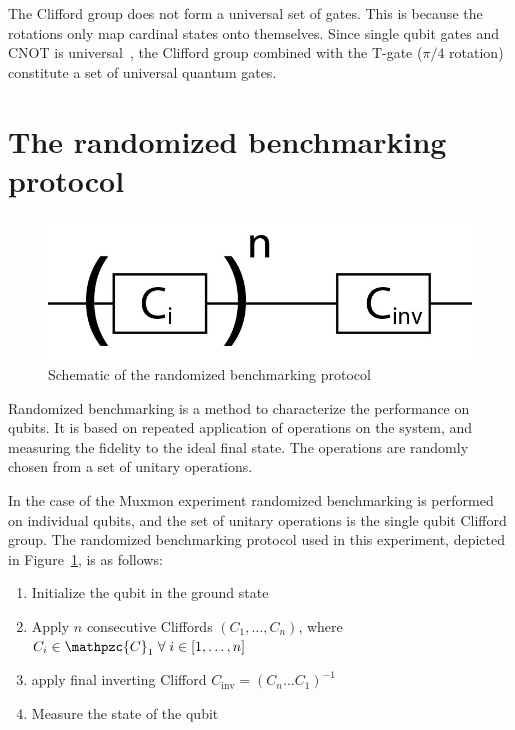       The Clifford group does not form a universal set of gates. This is because the rotations only map cardinal states onto themselves. Since single qubit gates and CNOT is universal~\cite{nielsen2010quantum}, the Clifford group combined with the T-gate ($\pi/4$ rotation) constitute a set of universal quantum gates.

    \section{The randomized benchmarking protocol}
      \label{sec:randomized benchmarking protocol}

      \begin{figure}
        \begin{center}
        \vspace{-30pt}
          \includegraphics[width=.8\textwidth]{../Figures/Randomized benchmarking/RB schematic.jpg}
        \end{center}
        \vspace{-20 pt}
        \caption{Schematic of the randomized benchmarking protocol}
        \label{fig:RB schematic}
      \end{figure}

      Randomized benchmarking is a method to characterize the performance on qubits. It is based on repeated application of operations on the system, and measuring the fidelity to the ideal final state. The operations are randomly chosen from a set of unitary operations.

      In the case of the Muxmon experiment randomized benchmarking is performed on individual qubits, and the set of unitary operations is the single qubit Clifford group. The randomized benchmarking protocol used in this experiment, depicted in Figure~\ref{fig:RB schematic}, is as follows:

      \begin{enumerate}
        \item Initialize the qubit in the ground state
        \item Apply $n$ consecutive Cliffords $\left(C_1, \dots, C_n\right)$, where $C_i \in \mathpzc{C}_1 \; \forall \; i \in \left[1, \dots, n\right]$
        \item apply final inverting Clifford $C_\text{inv}=\left( C_n \dots C_1 \right)^{-1}$
        \item Measure the state of the qubit
      \end{enumerate}


